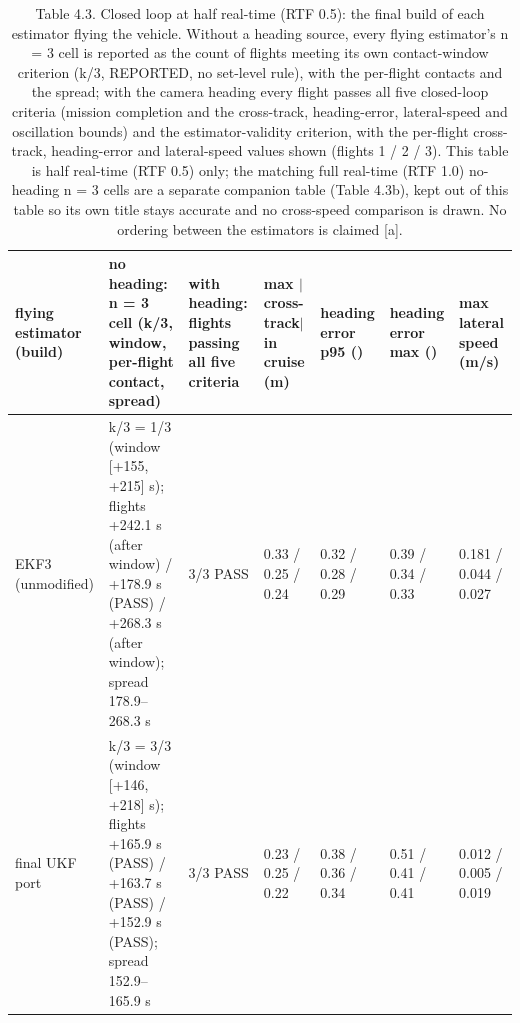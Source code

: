 \begin{table}[htbp]
\centering
\footnotesize
\caption{Table 4.3. Closed loop at half real-time (RTF 0.5): the final build of each estimator flying the vehicle. Without a heading source, every flying estimator's n = 3 cell is reported as the count of flights meeting its own contact-window criterion (k/3, REPORTED, no set-level rule), with the per-flight contacts and the spread; with the camera heading every flight passes all five closed-loop criteria (mission completion and the cross-track, heading-error, lateral-speed and oscillation bounds) and the estimator-validity criterion, with the per-flight cross-track, heading-error and lateral-speed values shown (flights 1 / 2 / 3). This table is half real-time (RTF 0.5) only; the matching full real-time (RTF 1.0) no-heading n = 3 cells are a separate companion table (Table 4.3b), kept out of this table so its own title stays accurate and no cross-speed comparison is drawn. No ordering between the estimators is claimed [a].}
\label{tab:4-3}
\begin{tabular}{p{}p{}p{}p{}p{}p{}p{}}
\toprule
\textbf{flying estimator (build)} & \textbf{no heading: n = 3 cell (k/3, window, per-flight contact, spread)} & \textbf{with heading: flights passing all five criteria} & \textbf{max $|$cross-track$|$ in cruise (m)} & \textbf{heading error p95 (\textdegree{})} & \textbf{heading error max (\textdegree{})} & \textbf{max lateral speed (m/s)} \\
\midrule
EKF3 (unmodified) & k/3 = 1/3 (window [+155, +215] s); flights +242.1 s (after window) / +178.9 s (PASS) / +268.3 s (after window); spread 178.9--268.3 s & 3/3 PASS & 0.33 / 0.25 / 0.24 & 0.32 / 0.28 / 0.29 & 0.39 / 0.34 / 0.33 & 0.181 / 0.044 / 0.027 \\
final UKF port & k/3 = 3/3 (window [+146, +218] s); flights +165.9 s (PASS) / +163.7 s (PASS) / +152.9 s (PASS); spread 152.9--165.9 s & 3/3 PASS & 0.23 / 0.25 / 0.22 & 0.38 / 0.36 / 0.34 & 0.51 / 0.41 / 0.41 & 0.012 / 0.005 / 0.019 \\

\end{tabular}
\end{table}
